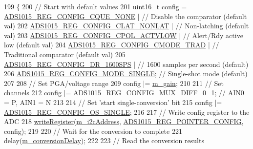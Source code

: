 \begin{DoxyCode}
199                                                    \{
200   \textcolor{comment}{// Start with default values}
201   uint16\_t config = \hyperlink{_cool_adafruit___a_d_s1015_8h_aa52ede69f39daf837bb2ebbe639dbef9}{ADS1015\_REG\_CONFIG\_CQUE\_NONE}    | \textcolor{comment}{// Disable the comparator
       (default val)}
202                     \hyperlink{_cool_adafruit___a_d_s1015_8h_a98757804761f1d945f4cf6ca40e30457}{ADS1015\_REG\_CONFIG\_CLAT\_NONLAT}  | \textcolor{comment}{// Non-latching
       (default val)}
203                     \hyperlink{_cool_adafruit___a_d_s1015_8h_a775f732c7e97574b38858820b96cf771}{ADS1015\_REG\_CONFIG\_CPOL\_ACTVLOW} | \textcolor{comment}{// Alert/Rdy active
       low   (default val)}
204                     \hyperlink{_cool_adafruit___a_d_s1015_8h_afb5240325d7ec757ccad7b098a2b93c3}{ADS1015\_REG\_CONFIG\_CMODE\_TRAD}   | \textcolor{comment}{// Traditional
       comparator (default val)}
205                     \hyperlink{_cool_adafruit___a_d_s1015_8h_aa4665026711a8587430d9235dbc4ccf0}{ADS1015\_REG\_CONFIG\_DR\_1600SPS}   | \textcolor{comment}{// 1600 samples per
       second (default)}
206                     \hyperlink{_cool_adafruit___a_d_s1015_8h_a50168c1821f075b7296745be1d4d346f}{ADS1015\_REG\_CONFIG\_MODE\_SINGLE};   \textcolor{comment}{// Single-shot mode
       (default)}
207 
208   \textcolor{comment}{// Set PGA/voltage range}
209   config |= \hyperlink{class_adafruit___a_d_s1015_a8db90fe03d55a18246984ba2ba5e7f32}{m\_gain};
210                     
211   \textcolor{comment}{// Set channels}
212   config |= \hyperlink{_cool_adafruit___a_d_s1015_8h_a7db34e6ba1050094aa2f5895594fa473}{ADS1015\_REG\_CONFIG\_MUX\_DIFF\_0\_1};          \textcolor{comment}{// AIN0 = P, AIN1 = N}
213 
214   \textcolor{comment}{// Set 'start single-conversion' bit}
215   config |= \hyperlink{_cool_adafruit___a_d_s1015_8h_a13f4550d061699b1cf4bd49520fc4a9c}{ADS1015\_REG\_CONFIG\_OS\_SINGLE};
216 
217   \textcolor{comment}{// Write config register to the ADC}
218   \hyperlink{_cool_adafruit___a_d_s1015_8cpp_a00ef55774dfb93dd0a7bf561d8451b71}{writeRegister}(\hyperlink{class_adafruit___a_d_s1015_a2186993621a7973256d47f086c74035d}{m\_i2cAddress}, 
      \hyperlink{_cool_adafruit___a_d_s1015_8h_ab9abb781632542a0e7d8b058292f26b1}{ADS1015\_REG\_POINTER\_CONFIG}, config);
219 
220   \textcolor{comment}{// Wait for the conversion to complete}
221   delay(\hyperlink{class_adafruit___a_d_s1015_aa3a29a64a6705fce1fee21d73c642a0e}{m\_conversionDelay});
222 
223   \textcolor{comment}{// Read the conversion results}

\end{DoxyCode}
